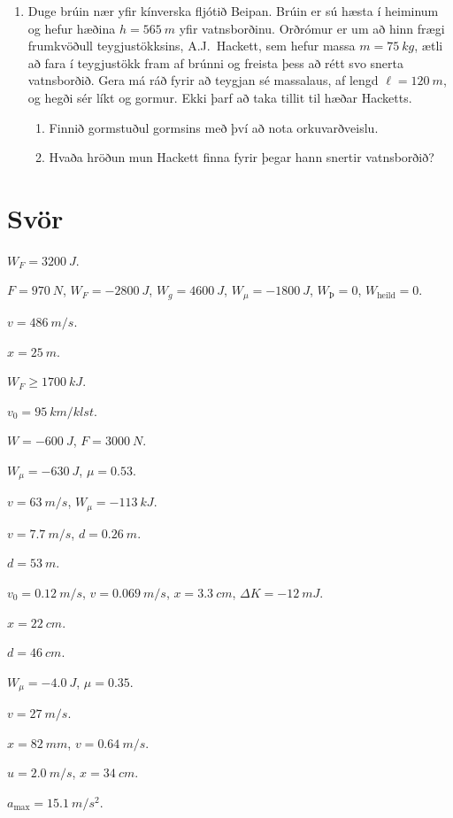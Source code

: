 \ifdefined \wholebook \else\documentclass[oneside]{book}\usepackage{EdlBook}\graphicspath{{figures/}}
\begin{document}
\begin{enumerate}[label = \textbf{Dæmi \thechapter.\arabic*.}]
\item Duge brúin nær yfir kínverska fljótið Beipan. Brúin er sú hæsta í heiminum og hefur hæðina $ h = \SI{565}{m}$ yfir vatnsborðinu. Orðrómur er um að hinn frægi frumkvöðull teygjustökksins, A.J.~Hackett, sem hefur massa $m = \SI{75}{kg}$, ætli að fara í teygjustökk fram af brúnni og freista þess að rétt svo snerta vatnsborðið. Gera má ráð fyrir að teygjan sé massalaus, af lengd $\ell = \SI{120}{m}$, og hegði sér líkt og gormur. Ekki þarf að taka tillit til hæðar Hacketts.
\begin{enumerate}[label = \textbf{(\alph*)}]
    \item Finnið gormstuðul gormsins með því að nota orkuvarðveislu.
    
    \item Hvaða hröðun mun Hackett finna fyrir þegar hann snertir vatnsborðið?
\end{enumerate}

\end{enumerate}


\section*{Svör}

\begin{enumerate*}[label = \vspace{0.15cm} \textbf{(\arabic*)}]
  \item $W_F = \SI{3200}{J}$.
  \item $F = \SI{970}{N}$, $W_F = \SI{-2800}{J}$, $W_g = \SI{4600}{J}$, $W_\mu = \SI{-1800}{J}$, $W_\text{Þ} = 0$, $W_{\text{heild}} = 0$.
  \item $v = \SI{486}{m/s}$.
  \item $x = \SI{25}{m}$.
  \item $W_F \geq \SI{1700}{kJ}$.
  \item $v_0 = \SI{95}{km/klst}$.
  \item $W = -\SI{600}{J}$, $F = \SI{3000}{N}$.
  \item $W_\mu = -\SI{630}{J}$, $\mu = 0.53$.
  \item $v = \SI{63}{m/s}$, $W_\mu = -\SI{113}{kJ}$.
  \item $v = \SI{7.7}{m/s}$, $d = \SI{0.26}{m}$.
  \item $d = \SI{53}{m}$.
  \item $v_0 = \SI{0.12}{m/s}$, $v = \SI{0.069}{m/s}$, $x = \SI{3.3}{cm}$, $\Delta K = -\SI{12}{mJ}$.
  \item $x = \SI{22}{cm}$.
  \item $d = \SI{46}{cm}$.
  \item $W_\mu = -\SI{4.0}{J}$, $\mu = 0.35$.
  \item $v = \SI{27}{m/s}$.
  \item $x = \SI{82}{mm}$, $v = \SI{0.64}{m/s}$.
  \item $u = \SI{2.0}{m/s}$, $x = \SI{34}{cm}$.
  \item $a_{\text{max}} = \SI{15.1}{m/s^2}$.
\end{enumerate*}


\ifdefined \wholebook \else
 \printindex
\end{document}
